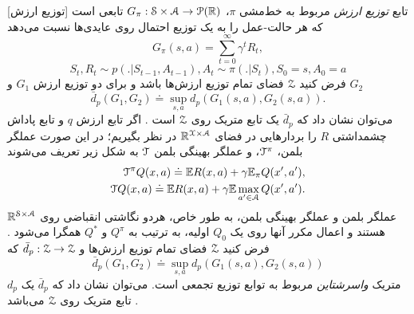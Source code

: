 [توزیع ارزش]
تابع 
\textit{توزیع ارزش}
مربوط به خط‌مشی $\pi$،
$G_\pi : \EuScript{S} \times \EuScript{A} \to \EuScript{P}(\mathbb{R})$
تابعی است که هر حالت-عمل را به یک توزیع احتمال روی عایدی‌ها نسبت می‌دهد
$$G_\pi(s,a) = \sum_{t=0}^{\infty} \gamma^t R_t, $$
$$S_t, R_t \sim p(.|S_{t-1}, A_{t-1}), A_t \sim \pi(.|S_t), S_0 = s, A_0=a$$ 
فرض کنید 
 $\EuScript{Z}$
  فضای تمام توزیع ارزش‌ها باشد و برای دو توزیع ارزش
  $G_1$
  و
  $G_2$
$$\bar{d}_p(G_1, G_2) \doteq \sup_{s,a} d_p(G_1(s,a), G_2(s,a)).$$
می‌توان نشان داد که $\bar{d}_p$ یک تابع متریک روی $\EuScript{Z}$ است
\cite{bellemare2017distributional}.
اگر تابع ارزش $q$ و تابع پاداش چشمداشتی $R$ را بردارهایی در فضای 
$\mathbb{R}^{\EuScript{X \times A}}$ 
در نظر بگیریم؛ در این صورت عملگر بلمن، $\EuScript{T}^\pi$، و عملگر بهینگی بلمن $\EuScript{T}$ به شکل زیر تعریف می‌شوند
\begin{align}
\EuScript{T}^\pi Q(x,a) \doteq \mathbb{E} R(x,a) + \gamma \mathbb{E}_\pi Q(x',a'), \\ \nonumber
\EuScript{T} Q(x,a) \doteq \mathbb{E} R(x,a) + \gamma \mathbb{E} \max_{a' \in \EuScript{A}} Q(x',a'). \nonumber
\end{align}
عملگر بلمن و عملگر بهینگی بلمن، به طور خاص، هردو نگاشتی انقباضی روی
$\mathbb{R}^{\EuScript{S} \times \EuScript{A}}$هستند و اعمال مکرر آنها روی یک $Q_0$ اولیه، به ترتیب به $Q^\pi$ و $Q^*$ همگرا می‌شود \cite{bertsekas1996neuro}.
فرض کنید 
$\EuScript{Z}$
فضای تمام توزیع ارزش‌ها و
$\bar{d}_p: \EuScript{Z} \to \EuScript{Z}$
که
$$\bar{d}_p(G_1, G_2) \doteq \sup_{s,a} d_p(G_1(s,a), G_2(s,a))$$
 $d_p$ متریک 
\textit{واسرشتاین}
مربوط به توابع توزیع تجمعی است.
می‌توان نشان داد که $\bar{d}_p$ یک تابع متریک روی $\EuScript{Z}$ می‌باشد
\cite{bellemare2017distributional}.

%
%

%
